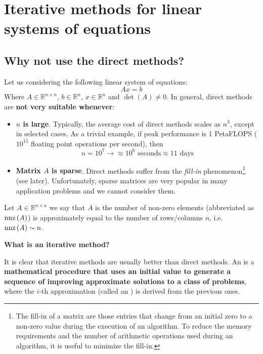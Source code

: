 \section{Iterative methods for linear systems of equations}

\subsection{Why not use the direct methods?}

Let us considering the following linear system of equations:
\begin{equation*}
    Ax = b
\end{equation*}
Where $A \in \mathbb{R}^{n \times n}$, $b \in \mathbb{R}^{n}$, $x \in \mathbb{R}^{n}$ and $\det\left(A\right) \ne 0$. In general, direct methods are \textbf{not very suitable whenever}:
\begin{itemize}
    \item \textbf{$n$ is large}. Typically, the average cost of direct methods scales as $n^{3}$, except in selected cases. As a trivial example, if peak performance is 1 PetaFLOPS ($10^{15}$ floating point operations per second), then
    \begin{equation*}
        n = 10^{7} \rightarrow \approx 10^{6} \text{ seconds} \approx 11 \text{ days}
    \end{equation*}
    \item \textbf{Matrix $A$ is sparse}. Direct methods suffer from the \emph{fill-in} phenomenon\footnote{The fill-in of a matrix are those entries that change from an initial zero to a non-zero value during the execution of an algorithm. To reduce the memory requirements and the number of arithmetic operations used during an algorithm, it is useful to minimize the fill-in.} (see later). Unfortunately, sparse matrices are very popular in many application problems and we cannot consider them.
\end{itemize}

\highspace
\begin{definitionbox}
    Let $A \in \mathbb{R}^{n \times n}$ we say that $A$ is  the number of non-zero elements (abbreviated as $\mathrm{nnz}\left(A\right)$) is approximately equal to the number of rows/columns $n$, i.e. $\mathrm{nnz}\left(A\right) \sim n$.
\end{definitionbox}

\highspace
\begin{flushleft}
    \textcolor{Green3}{ \textbf{What is an iterative method?}}
\end{flushleft}
It is clear that iterative methods are usually better than direct methods. An  is a \textbf{mathematical procedure that uses an initial value to generate a sequence of improving approximate solutions to a class of problems}, where the $i$-th approximation (called an ) is derived from the previous ones.

